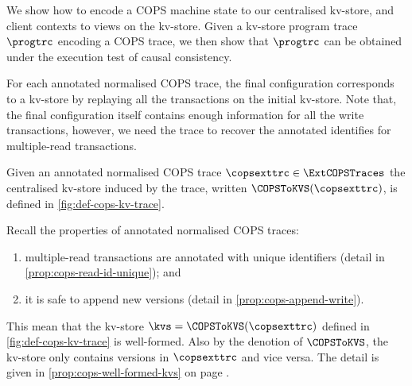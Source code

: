 We show how to encode a COPS machine state to our centralised kv-store,
and client contexts to views on the kv-store.
Given a kv-store program trace \( \progtrc \) encoding a COPS trace, 
we then show that \( \progtrc \) can be obtained under the execution test of causal consistency.

For each annotated normalised COPS trace,
the final configuration corresponds to a kv-store by replaying all the transactions on the initial kv-store.
Note that, the final configuration itself contains enough information for all the write transactions,
however, we need the trace to recover the annotated identifies for multiple-read transactions.

\begin{definition}
Given an annotated normalised COPS trace \( \copsexttrc \in \ExtCOPSTraces \) 
the centralised kv-store induced by the trace, written \( \COPSToKVS(\copsexttrc) \), is defined in \cref{fig:def-cops-kv-trace}.
\end{definition}



Recall the properties of annotated normalised COPS traces:
\begin{enumerate}
\item multiple-read transactions are annotated with unique identifiers (detail in \cref{prop:cops-read-id-unique});
and \item it is safe to append new versions (detail in \cref{prop:cops-append-write}).
\end{enumerate}
This mean that the kv-store \( \kvs  = \COPSToKVS(\copsexttrc) \) defined in \cref{fig:def-cops-kv-trace} is well-formed.
Also by the denotion of \( \COPSToKVS \), the kv-store only contains versions in \( \copsexttrc \) and vice versa.
The detail is given in \cref{prop:cops-well-formed-kvs} on page \pageref{sec:cops-well-formed-encoded-kv-store}.

